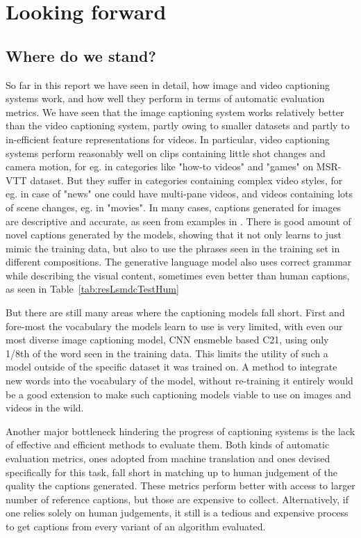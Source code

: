 \chapter{Looking forward}
\label{chapter:discussion}
\section{Where do we stand?}

So far in this report we have seen in detail, how image and video captioning
systems work, and how well they perform in terms of automatic evaluation
metrics.
We have seen that the image captioning system works relatively better than the
video captioning system, partly owing to smaller datasets and partly to
in-efficient feature representations for videos.
In particular, video captioning systems perform reasonably well on clips
containing little shot changes and camera motion, for eg. in categories like
"how-to videos" and "games" on MSR-VTT dataset.
But they suffer in categories containing complex video styles, for eg. in case
of "news" one could have multi-pane videos, and videos containing lots of scene
changes, eg. in "movies".
In many cases, captions generated for images are descriptive and accurate, as
seen from examples in .
There is good amount of novel captions generated by the models, showing that it
not only learns to just mimic the training data, but also to use the phrases
seen in the training set in different compositions.
The generative language model also uses correct grammar while describing the
visual content, sometimes even better than human captions, as seen in
Table~\ref{tab:resLsmdcTestHum}

But there are still many areas where the captioning models fall short.
First and fore-most the vocabulary the models learn to use is very limited,
with even our most diverse image captioning model, CNN ensmeble based C21,
using only 1/8th of the word seen in the training data. 
This limits the utility of such a model outside of the specific dataset it was
trained on.
A method to integrate new words into the vocabulary of the model, without
re-training it entirely would be a good extension to make such captioning
models viable to use on images and videos in the wild.

Another major bottleneck hindering the progress of captioning systems is the
lack of effective and efficient methods to evaluate them.
Both kinds of automatic evaluation metrics, ones adopted from machine
translation and ones devised specifically for this task, fall short in matching
up to human judgement of the quality the captions generated.
These metrics perform better with access to larger number of reference
captions, but those are expensive to collect.
Alternatively, if one relies solely on human judgements, it still is a tedious
and expensive process to get captions from every variant of an algorithm
evaluated.


